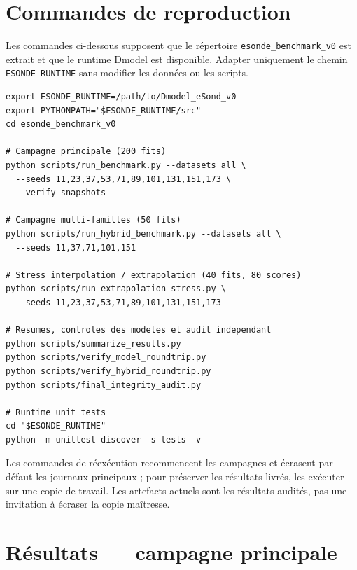 \documentclass[11pt,a4paper]{article}
\begin{document}
\section{Commandes de reproduction}
Les commandes ci-dessous supposent que le répertoire \texttt{esonde\_benchmark\_v0} est extrait et que le runtime Dmodel est disponible. Adapter uniquement le chemin \texttt{ESONDE\_RUNTIME} sans modifier les données ou les scripts.
\begin{lstlisting}[basicstyle=\ttfamily\small,breaklines=true]
export ESONDE_RUNTIME=/path/to/Dmodel_eSond_v0
export PYTHONPATH="$ESONDE_RUNTIME/src"
cd esonde_benchmark_v0

# Campagne principale (200 fits)
python scripts/run_benchmark.py --datasets all \
  --seeds 11,23,37,53,71,89,101,131,151,173 \
  --verify-snapshots

# Campagne multi-familles (50 fits)
python scripts/run_hybrid_benchmark.py --datasets all \
  --seeds 11,37,71,101,151

# Stress interpolation / extrapolation (40 fits, 80 scores)
python scripts/run_extrapolation_stress.py \
  --seeds 11,23,37,53,71,89,101,131,151,173

# Resumes, controles des modeles et audit independant
python scripts/summarize_results.py
python scripts/verify_model_roundtrip.py
python scripts/verify_hybrid_roundtrip.py
python scripts/final_integrity_audit.py

# Runtime unit tests
cd "$ESONDE_RUNTIME"
python -m unittest discover -s tests -v
\end{lstlisting}
Les commandes de réexécution recommencent les campagnes et écrasent par défaut les journaux principaux ; pour préserver les résultats livrés, les exécuter sur une copie de travail. Les artefacts actuels sont les résultats audités, pas une invitation à écraser la copie maîtresse.

\section{Résultats — campagne principale}
\end{document}
